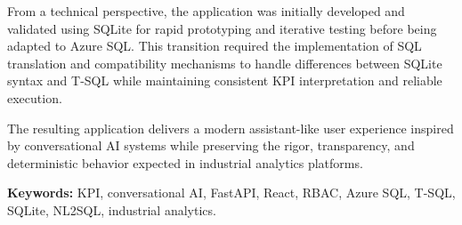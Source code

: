 From a technical perspective, the application was initially developed and validated using SQLite for rapid prototyping and iterative testing before being adapted to Azure SQL. This transition required the implementation of SQL translation and compatibility mechanisms to handle differences between SQLite syntax and T-SQL while maintaining consistent KPI interpretation and reliable execution.

The resulting application delivers a modern assistant-like user experience inspired by conversational AI systems while preserving the rigor, transparency, and deterministic behavior expected in industrial analytics platforms.

\vspace{1em}
\noindent\textbf{Keywords:} KPI, conversational AI, FastAPI, React, RBAC, Azure SQL, T-SQL, SQLite, NL2SQL, industrial analytics.
